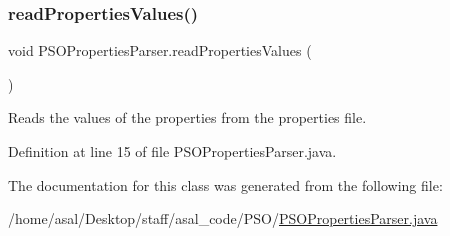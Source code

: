 \subsubsection{\texorpdfstring{read\+Properties\+Values()}{readPropertiesValues()}}
{\footnotesize\ttfamily void P\+S\+O\+Properties\+Parser.\+read\+Properties\+Values (\begin{DoxyParamCaption}{ }\end{DoxyParamCaption})}

Reads the values of the properties from the properties file. 

Definition at line 15 of file P\+S\+O\+Properties\+Parser.\+java.



The documentation for this class was generated from the following file\+:\begin{DoxyCompactItemize}
\item 
/home/asal/\+Desktop/staff/asal\+\_\+code/\+P\+S\+O/\hyperlink{_p_s_o_properties_parser_8java}{P\+S\+O\+Properties\+Parser.\+java}\end{DoxyCompactItemize}
